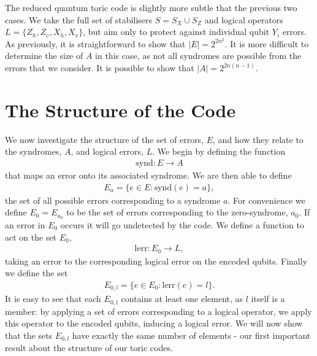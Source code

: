The reduced quantum toric code is slightly more subtle that the previous two cases. We take the full set of stabilisers $S = S_X \cup S_Z$ and logical operators $L = \{Z_h, Z_v, X_h, X_v\}$, but aim only to protect against individual qubit $Y_i$ errors. As previously, it is straightforward to show that $|E| = 2^{2n^2}$. It is more difficult to determine the size of $A$ in this case, as not all syndromes are possible from the errors that we consider. It is possible to show that $|A| = 2^{2n(n-1)}$.

\section{The Structure of the Code}

We now investigate the structure of the set of errors, $E$, and how they relate to the syndromes, $A$, and logical errors, $L$. We begin by defining the function
\begin{align}
  \text{synd}: E \rightarrow A
\end{align}
that maps an error onto its associated syndrome. We are then able to define
\begin{align}
  E_a = \{ e\in E : \text{synd}(e) = a \},
\end{align}
the set of all possible errors corresponding to a syndrome $a$. For convenience we define $E_0 = E_{a_0}$ to be the set of errors corresponding to the zero-syndrome, $a_0$. If an error in $E_0$ occurs it will go undetected by the code. We define a function to act on the set $E_0$,
\begin{align}
  \text{lerr}: E_0 \rightarrow L,
\end{align}
taking an error to the corresponding logical error on the encoded qubits. Finally we define the set
\begin{align}
  E_{0, l} = \{ e\in E_0: \text{lerr}(e) = l \}.
\end{align}
It is easy to see that each $E_{0, l}$ contains at least one element, as $l$ itself is a member: by applying a set of errors corresponding to a logical operator, we apply this operator to the encoded qubits, inducing a logical error.  We will now show that the sets $E_{0,l}$ have exactly the same number of elements - our first important result about the structure of our toric codes.


